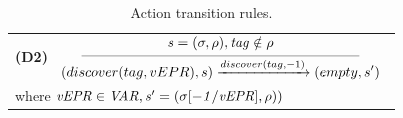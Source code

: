 \begin{table}[!h]
{{\begin{tabular}{l}
\hspace{0cm}\textbf{(D2)}\hspace{-0.2cm}
$\reglaa{ %
{\it s=(\sigma,\rho), tag \notin \rho}
}
{ %
(discover(tag,vEPR),s)
\xrightarrow{discover(tag,-1)}
(empty,s')
}{7}$
\\
\hspace{0.1cm}{\tiny where ${\it vEPR \in VAR, s'=(\sigma[sel(\rho,tag)/vEPR],\rho))}$} \hspace{4cm}
{\tiny where ${\it vEPR \in VAR, s'=(\sigma[-1/vEPR],\rho))}$}

\end{tabular}
}
}
\vspace{-0.3cm}
\caption{\label{tran1}Action transition rules.}
\vspace{-0.5cm}
\end{table}


